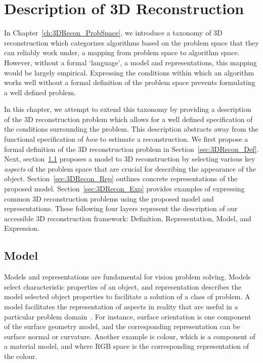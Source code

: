 
\chapter{Description of 3D Reconstruction}
\label{ch:3DRecon_Desc}
In Chapter~\ref{ch:3DRecon_ProbSpace}, we introduce a taxonomy of 3D reconstruction which categorizes algorithms based on the problem space that they can reliably work under, \ie a mapping from problem space to algorithm space. However, without a formal `language', \ie a model and representations, this mapping would be largely empirical. Expressing the conditions within which an algorithm works well without a formal definition of the problem space prevents formulating a well defined problem.

In this chapter, we attempt to extend this taxonomy by providing a description of the 3D reconstruction problem which allows for a well defined specification of the conditions surrounding the problem. This description abstracts away from the functional specification of \textit{how} to estimate a reconstruction. We first propose a formal definition of the 3D reconstruction problem in Section~\ref{sec:3DRecon_Def}. Next, section~\ref{sec:3DRecon_Model} proposes a model to 3D reconstruction by selecting various key \textit{aspects} of the problem space that are crucial for describing the appearance of the object. Section~\ref{sec:3DRecon_Rep} outlines concrete representations of the proposed model. Section~\ref{sec:3DRecon_Exp} provides examples of expressing common 3D reconstruction problems using the proposed model and representations. These following four layers represent the description of our accessible 3D reconstruction framework: Definition, Representation, Model, and Expression.


\section{Model}
\label{sec:3DRecon_Model}
Models and representations are fundamental for vision problem solving. Models select characteristic properties of an object, and representation describes the model selected object properties to facilitate a solution of a class of problem. A model facilitates the representation of aspects in reality that are useful in a particular problem domain~\cite{bolles19863dpo}. For instance, surface orientation is one component of the surface geometry model, and the corresponding representation can be surface normal or curvature. Another example is colour, which is a component of a material model, and where RGB space is the corresponding representation of the colour.

